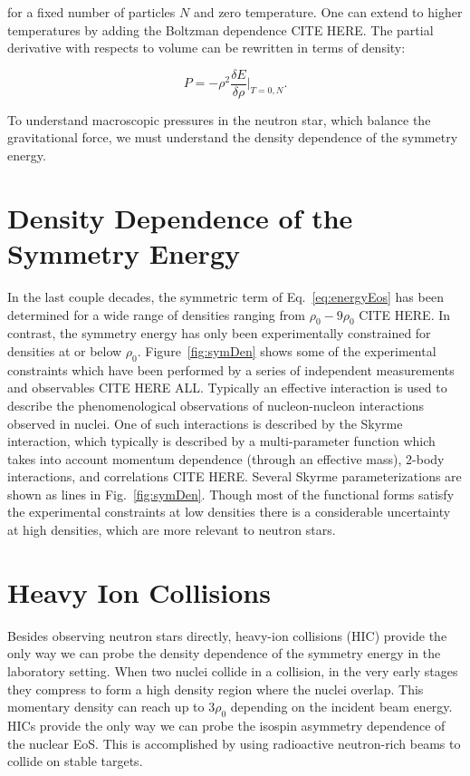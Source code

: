 for a fixed number of particles $N$ and zero temperature. One can extend to higher temperatures by adding the Boltzman dependence CITE HERE. The partial derivative with respects to volume can be rewritten in terms of density:

\begin{equation}
P = -\rho^2 \frac{\delta E}{\delta \rho}\vert_{T=0,N}.
\label{eq:densEos}
\end{equation}

To understand macroscopic pressures in the neutron star, which balance the gravitational force, we must understand the density dependence of the symmetry energy. 

\section{Density Dependence of the Symmetry Energy}
In the last couple decades, the symmetric term of Eq.~\ref{eq:energyEos} has been determined for a wide range of densities ranging from $\rho_0 - 9\rho_0$ CITE HERE. In contrast, the symmetry energy has only been experimentally constrained for densities at or below $\rho_0$. Figure~\ref{fig:symDen} shows some of the experimental constraints which have been performed by a series of independent measurements and observables CITE HERE ALL. Typically an effective interaction is used to describe the phenomenological observations of nucleon-nucleon interactions observed in nuclei. One of such interactions is described by the Skyrme interaction, which typically is described by a multi-parameter function which takes into account momentum dependence (through an effective mass), 2-body interactions, and correlations CITE HERE. Several Skyrme parameterizations are shown as lines in Fig.~\ref{fig:symDen}. Though most of the functional forms satisfy the experimental constraints at low densities there is a considerable uncertainty at high densities, which are more relevant to neutron stars. 




\section{Heavy Ion Collisions}
Besides observing neutron stars directly, heavy-ion collisions (HIC) provide the only way we can probe the density dependence of the symmetry energy in the laboratory setting. When two nuclei collide in a collision, in the very early stages they compress to form a high density region where the nuclei overlap. This momentary density can reach up to $3\rho_0$ depending on the incident beam energy. HICs provide the only way we can probe the isospin asymmetry dependence of the nuclear EoS. This is accomplished by using radioactive neutron-rich beams to collide on stable targets. 


